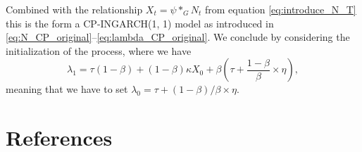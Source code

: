 \documentclass[review]{elsarticle}
\begin{document}
Combined with the relationship $X_t = \psi *_G N_t$ from equation \eqref{eq:introduce_N_T} this is the form a CP-INGARCH(1, 1) model as introduced in \eqref{eq:N_CP_original}--\eqref{eq:lambda_CP_original}. We conclude by considering the initialization of the process, where we have
$$
\lambda_1 = \tau(1 - \beta) + (1 - \beta)\kappa X_0 + \beta\left(\tau + \frac{1 - \beta}{\beta} \times \eta \right),
$$
meaning that we have to set $\lambda_0 = \tau + (1 - \beta)/\beta \times \eta$.

%
%
%



%

\section*{References}



\end{document}
